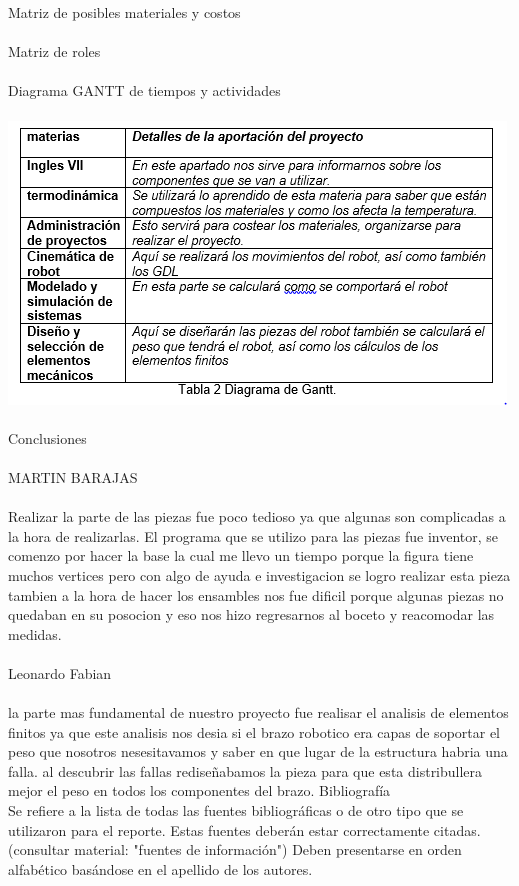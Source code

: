 \documentclass[12pt,letterpaper]{article}
\begin{document}
\newpage
Matriz de posibles materiales y costos
\\\\
Matriz de roles
\\\\
Diagrama GANTT de tiempos y actividades
\\\\
\includegraphics[scale=1.3]{imag5.PNG}  
\\\\
Conclusiones
\\\\
MARTIN BARAJAS
\\\\
Realizar la parte de las piezas fue poco tedioso ya que algunas son complicadas a la hora de realizarlas. El programa que se utilizo para las piezas fue inventor, se comenzo por hacer la base la cual me llevo un tiempo porque la figura tiene muchos vertices pero con algo de ayuda  e investigacion se logro realizar esta pieza tambien a la hora de hacer los ensambles nos fue dificil porque algunas piezas no quedaban en su posocion y eso nos hizo regresarnos al boceto y reacomodar las medidas. 
\\\\
Leonardo Fabian
\\\\
la parte mas fundamental de nuestro proyecto fue realisar el analisis de elementos finitos ya que este analisis nos desia si el brazo robotico era capas de soportar el peso que nosotros nesesitavamos y saber en que lugar de la estructura habria una falla. al descubrir las fallas rediseñabamos la pieza para que esta distribullera mejor el peso en todos los componentes del brazo.
\newpage
Bibliografía
\\
Se refiere a la lista de todas las fuentes bibliográficas o de otro tipo que se utilizaron para el reporte. Estas fuentes deberán estar correctamente citadas. (consultar material: "fuentes de información")
Deben presentarse en orden alfabético basándose en el apellido de los autores.  
\end{document}
